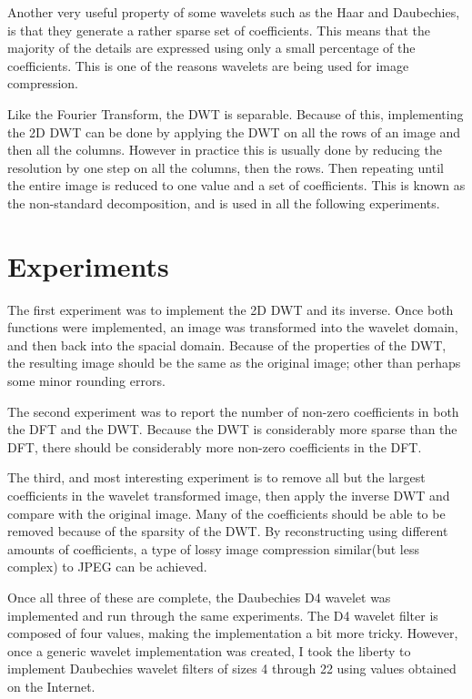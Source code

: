 Another very useful property of some wavelets such as the Haar and Daubechies, is that they generate a rather sparse set of coefficients.  This means that the majority of the details are expressed using only a small percentage of the coefficients.  This is one of the reasons wavelets are being used for image compression.

Like the Fourier Transform, the DWT is separable.  Because of this, implementing the 2D DWT can be done by applying the DWT on all the rows of an image and then all the columns.  However in practice this is usually done by reducing the resolution by one step on all the columns, then the rows.  Then repeating until the entire image is reduced to one value and a set of coefficients.  This is known as the non-standard decomposition, and is used in all the following experiments.

\section{Experiments}

The first experiment was to implement the 2D DWT and its inverse.  Once both functions were implemented, an image was transformed into the wavelet domain, and then back into the spacial domain.  Because of the properties of the DWT, the resulting image should be the same as the original image; other than perhaps some minor rounding errors.

The second experiment was to report the number of non-zero coefficients in both the DFT and the DWT.  Because the DWT is considerably more sparse than the DFT, there should be considerably more non-zero coefficients in the DFT. 

The third, and most interesting experiment is to remove all but the largest coefficients in the wavelet transformed image, then apply the inverse DWT and compare with the original image.  Many of the coefficients should be able to be removed because of the sparsity of the DWT.  By reconstructing using different amounts of coefficients, a type of lossy image compression similar(but less complex) to   JPEG can be achieved.

Once all three of these are complete, the Daubechies D4 wavelet was implemented and run through the same experiments.  The D4 wavelet filter is composed of four values, making the implementation a bit more tricky.  However, once a generic wavelet implementation was created, I took the liberty to implement Daubechies wavelet filters of sizes 4 through 22 using values obtained on the Internet.

